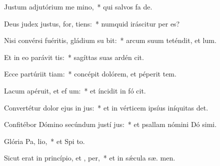 \item Justum adjutórium me  mino,~* qui salvos fa  de.
\item Deus judex justus, for,  tiens:~* numquid iráscitur per  es?
\item Nisi convérsi fuéritis, gládium su bit:~* arcum suum teténdit, et  lum.
\item Et in eo parávit  tis:~* sagíttas suas ardén cit.
\item Ecce partúriit tiam:~* concépit dolórem, et péperit tem.
\item Lacum apéruit, et ef um:~* et íncidit in fó  cit.
\item Convertétur dolor ejus in  jus:~* et in vérticem ipsíus iníquitas  det.
\item Confitébor Dómino secúndum justí jus:~* et psallam nómini Dó simi.
\item Glória Pa,  lio,~* et Spi to.
\item Sicut erat in princípio, et ,  per,~* et in sǽcula sæ. men.
